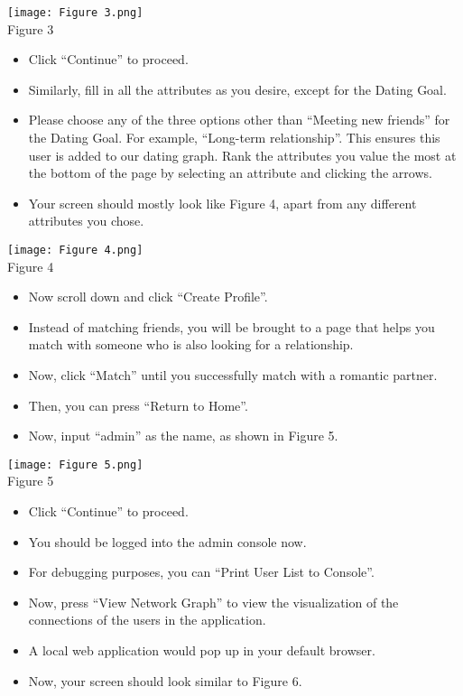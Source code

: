 \documentclass[fontsize=11pt]{article}
\begin{document}
\begin{center}
\texttt{[image: Figure 3.png]}
\\
\caption{Figure 3}
\end{center}
\newpage
\begin{itemize}
    \item Click ``Continue” to proceed.
    \item Similarly, fill in all the attributes as you desire, except for the Dating Goal.
    \item Please choose any of the three options other than ``Meeting new friends” for the Dating Goal. For example, ``Long-term relationship”. This ensures this user is added to our dating graph. Rank the attributes you value the most at the bottom of the page by selecting an attribute and clicking the arrows.
    \item Your screen should mostly look like Figure 4, apart from any different attributes you chose.
\end{itemize}
\begin{center}
\texttt{[image: Figure 4.png]}
\\
\caption{Figure 4}
\end{center}
\newpage
\begin{itemize}
    \item Now scroll down and click ``Create Profile”.
    \item Instead of matching friends, you will be brought to a page that helps you match with someone who is also looking for a relationship.
    \item Now, click ``Match” until you successfully match with a romantic partner.
    \item Then, you can press ``Return to Home”.
    \item Now, input ``admin” as the name, as shown in Figure 5.
\end{itemize}
\begin{center}
\texttt{[image: Figure 5.png]}
\\
\caption{Figure 5}
\end{center}
\newpage
\begin{itemize}
    \item Click ``Continue” to proceed.
    \item You should be logged into the admin console now.
    \item For debugging purposes, you can ``Print User List to Console”.
    \item Now, press ``View Network Graph” to view the visualization of the connections of the users in the application.
    \item A local web application would pop up in your default browser.
    \item Now, your screen should look similar to Figure 6.
\end{itemize}
\end{document}
